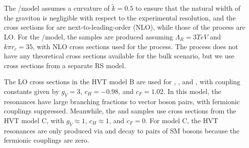 The \ggF/\VBF\GBulktoWW model assumes a curvature of $\tilde{k}=0.5$ to ensure that the natural width of the graviton is negligible with respect to the experimental resolution, and the cross sections for \ggF\GBulktoWW are next-to-leading-order (NLO), while those of the \VBF process are LO.
For the \ggF/\VBF\RadtoWW model, the samples are produced assuming $\Lambda_{R}=3\unit{TeV}$ and $k\pi r_c=35$, with NLO cross sections used for the \ggF process.
The \VBF process does not have any theoretical cross sections available for the bulk scenario, but we use cross sections from a separate RS model.

The LO cross sections in the HVT model B are used for \DY\ZprtoWW, \DY\WprtoWZ, and \DY\WprtoWH, with coupling constants given by $g_V=3$, $c_H=-0.98$, and $c_F=1.02$.
In this model, the resonances have large branching fractions to vector boson pairs, with fermionic couplings suppressed.
Meanwhile, the \VBF\ZprtoWW and \DY\WprtoWZ samples use cross sections from the HVT model C, with $g_V\approx1$, $c_H\approx1$, and $c_F=0$. %
For model C, the HVT resonances are only produced via \VBF and decay to pairs of SM bosons because the fermionic couplings are zero.

